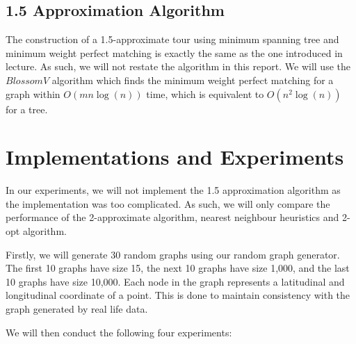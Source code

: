 \documentclass[paper=a4, fontsize=11pt]{scrartcl}	%
\numberwithin{equation}{section}		%
\numberwithin{figure}{section}			%
\numberwithin{table}{section}				%
\begin{document}
\subsection{1.5 Approximation Algorithm}
The construction of a 1.5-approximate tour using minimum spanning tree and minimum weight perfect matching is exactly the same as the one introduced in lecture. As such, we will not restate the algorithm in this report. We will use the $Blossom V$ algorithm \cite{kolmogorov} which finds the minimum weight perfect matching for a graph within $O(mn \log(n))$ time, which is equivalent to $O(n^2 \log(n))$ for a tree.

\section{Implementations and Experiments}

In our experiments, we will not implement the 1.5 approximation algorithm as the implementation was too complicated. As such, we will only compare the performance of the 2-approximate algorithm, nearest neighbour heuristics and 2-opt algorithm. 

Firstly, we will generate 30 random graphs using our random graph generator. The first 10 graphs have size 15, the next 10 graphs have size 1,000, and the last 10 graphs have size 10,000. Each node in the graph represents a latitudinal and longitudinal coordinate of a point. This is done to maintain consistency with the graph generated by real life data.

We will then conduct the following four experiments:
\end{document}
